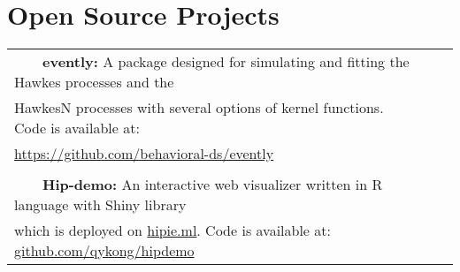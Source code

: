 \documentclass[a4paper,10pt]{article}
\newcommand{\tabitem}{~~\llap{\textbullet}~~}
\begin{document}
\section{Open Source Projects}
\begin{tabular}{lcc}
\tabitem \textbf{evently:} A package designed for simulating and fitting the Hawkes processes and the \\
\hspace{1em} HawkesN processes with several options of kernel functions. Code is available at:\\
\hspace{1em}  \href{https://github.com/behavioral-ds/evently}{https://github.com/behavioral-ds/evently}\\
\multicolumn{2}{c}{}\\
\tabitem \textbf{Hip-demo:} An interactive web visualizer written in R language with Shiny library\\
\hspace{1em} which is deployed on \href{www.hipie.ml}{hipie.ml}. Code is available at: \href{https://github.com/qykong/hipdemo}{github.com/qykong/hipdemo}\\
\end{tabular}
\\
 

\end{document}
